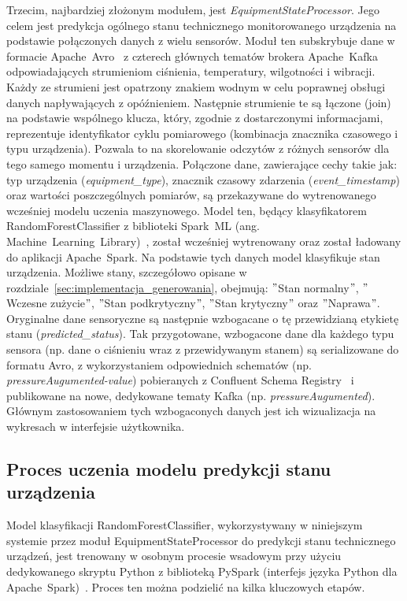 Trzecim, najbardziej złożonym modułem, jest \textit{EquipmentStateProcessor}. Jego celem jest predykcja ogólnego stanu technicznego monitorowanego urządzenia na podstawie połączonych danych z wielu sensorów. Moduł ten subskrybuje dane w formacie \mbox{Apache Avro}~\cite{avro_documentation} z czterech głównych tematów brokera \mbox{Apache Kafka} odpowiadających strumieniom ciśnienia, temperatury, wilgotności i wibracji. Każdy ze strumieni jest opatrzony znakiem wodnym w celu poprawnej obsługi danych napływających z opóźnieniem. Następnie strumienie te są łączone (join) na podstawie wspólnego klucza, który, zgodnie z dostarczonymi informacjami, reprezentuje identyfikator cyklu pomiarowego (kombinacja znacznika czasowego i typu urządzenia). Pozwala to na skorelowanie odczytów z różnych sensorów dla tego samego momentu i urządzenia. Połączone dane, zawierające cechy takie jak: typ urządzenia (\textit{equipment\_type}), znacznik czasowy zdarzenia (\textit{event\_timestamp}) oraz wartości poszczególnych pomiarów, są przekazywane do wytrenowanego wcześniej modelu uczenia maszynowego. Model ten, będący klasyfikatorem RandomForestClassifier z biblioteki \mbox{Spark ML} (ang. \mbox{Machine Learning Library})~\cite{spark_mllib_reference}, został wcześniej wytrenowany oraz został ładowany do aplikacji \mbox{Apache Spark}. Na podstawie tych danych model klasyfikuje stan urządzenia. Możliwe stany, szczegółowo opisane w rozdziale~\ref{sec:implementacja_generowania}, obejmują: \("\)Stan normalny\("\), \("\)Wczesne zużycie\("\), \("\)Stan podkrytyczny\("\), \("\)Stan krytyczny\("\) oraz \("\)Naprawa\("\). Oryginalne dane sensoryczne są następnie wzbogacane o tę przewidzianą etykietę stanu (\textit{predicted\_status}). Tak przygotowane, wzbogacone dane dla każdego typu sensora (np. dane o ciśnieniu wraz z przewidywanym stanem) są serializowane do formatu Avro, z wykorzystaniem odpowiednich schematów (np. \textit{pressureAugumented-value}) pobieranych z Confluent Schema Registry~\cite{confluent_schema_registry} i publikowane na nowe, dedykowane tematy Kafka (np. \textit{pressureAugumented}). Głównym zastosowaniem tych wzbogaconych danych jest ich wizualizacja na wykresach w interfejsie użytkownika.

\subsection{Proces uczenia modelu predykcji stanu urządzenia}
\label{subsec:uczenie_modelu_stanu}

Model klasyfikacji RandomForestClassifier, wykorzystywany w niniejszym systemie przez moduł EquipmentStateProcessor do predykcji stanu technicznego urządzeń, jest trenowany w osobnym procesie wsadowym przy użyciu dedykowanego skryptu Python z biblioteką \mbox{PySpark} (interfejs języka Python dla \mbox{Apache Spark})~\cite{pyspark_docs}. Proces ten można podzielić na kilka kluczowych etapów.

